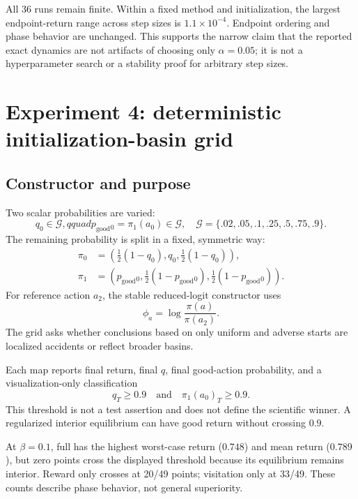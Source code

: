 \documentclass[10pt,a4paper]{article}
\newcommand{\good}{p_{\mathrm{good}}}
\begin{document}
All 36 runs remain finite.  Within a fixed method and initialization, the
largest endpoint-return range across step sizes is $1.1\times10^{-4}$.
Endpoint ordering and phase behavior are unchanged.  This supports the narrow
claim that the reported exact dynamics are not artifacts of choosing only
$\alpha=0.05$; it is not a hyperparameter search or a stability proof for
arbitrary step sizes.

\section{Experiment 4: deterministic initialization-basin grid}

\subsection{Constructor and purpose}

Two scalar probabilities are varied:
\begin{equation}
q_0\in\mathcal G,qquad \good{}_0=\pi_1(a_0)\in\mathcal G,
\quad
\mathcal G=\{.02,.05,.1,.25,.5,.75,.9\}.
\end{equation}
The remaining probability is split in a fixed, symmetric way:
\begin{align}
\pi_0&=(\tfrac12(1-q_0),q_0,\tfrac12(1-q_0)),\\
\pi_1&=(\good{}_0,\tfrac12(1-\good{}_0),\tfrac12(1-\good{}_0)).
\end{align}
For reference action $a_2$, the stable reduced-logit constructor uses
\begin{equation}
\phi_a=\log\frac{\pi(a)}{\pi(a_2)}.
\end{equation}
The grid asks whether conclusions based on only uniform and adverse starts are
localized accidents or reflect broader basins.

Each map reports final return, final $q$, final good-action probability, and a
visualization-only classification
\begin{equation}
q_T\geq0.9\quad\text{and}\quad\pi_1(a_0)_T\geq0.9.
\end{equation}
This threshold is not a test assertion and does not define the scientific
winner.  A regularized interior equilibrium can have good return without
crossing $0.9$.

At $\beta=0.1$, full has the highest worst-case return ($0.748$) and mean return
($0.789$), but zero points cross the displayed threshold because its equilibrium
remains interior.  Reward only crosses at 20/49 points; visitation only at
33/49.  These counts describe phase behavior, not general superiority.
\end{document}
